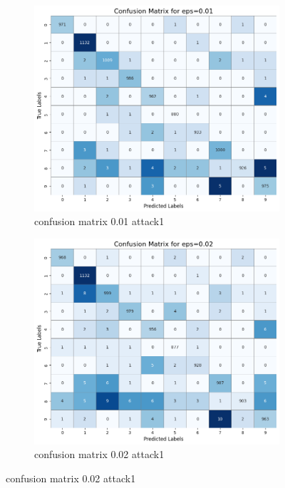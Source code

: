 \documentclass[11pt,onside]{article}
\begin{document}
\begin{figure}[h]
  \centering
  \begin{subfigure}[b]{0.49\textwidth}
    \centering
    \includegraphics[width=\textwidth]{V2_images/confusion_matrix_eps_0.01_attack_1.png}
    \caption{confusion matrix 0.01 attack1}
    \label{fig:image1}
  \end{subfigure}
  \hfill
  \begin{subfigure}[b]{0.49\textwidth}
    \centering
    \includegraphics[width=\textwidth]{V2_images/confusion_matrix_eps_0.02_attack_1.png}
    \caption{confusion matrix 0.02 attack1}
    \label{fig:image2}
  \end{subfigure}
  
  \label{fig:images}
\end{figure}
\end{document}
